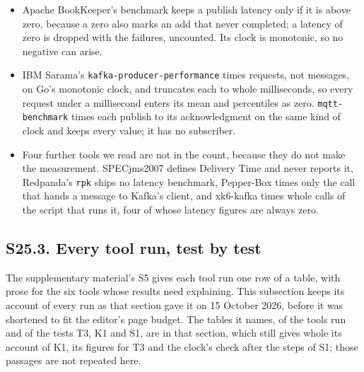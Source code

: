 \documentclass[10pt,journal,onecolumn]{IEEEtran}
\begin{document}
\begin{itemize}
starts at zero and only rises, so the value can never appear there.
\item Apache BookKeeper's benchmark keeps a publish latency only if it is above zero, because a
zero also marks an add that never completed; a latency of zero is dropped with the failures,
uncounted. Its clock is monotonic, so no negative can arise.
\item IBM Sarama's \texttt{kafka-producer-performance} times requests, not messages, on Go's
monotonic clock, and truncates each to whole milliseconds, so every request under a millisecond
enters its mean and percentiles as zero. \texttt{mqtt-benchmark} times each publish to its
acknowledgment on the same kind of clock and keeps every value; it has no subscriber.
\item Four further tools we read are not in the count, because they do not make the measurement.
SPECjms2007 defines Delivery Time and never reports it, Redpanda's \texttt{rpk} ships no latency
benchmark, Pepper-Box times only the call that hands a message to Kafka's client, and xk6-kafka
times whole calls of the script that runs it, four of whose latency figures are always zero.
\end{itemize}

\subsection{S25.3. Every tool run, test by test}
\label{sec:everytoolrun}

The supplementary material's S5 gives each tool run one row of a table, with prose for the six
tools whose results need explaining. This subsection keeps its account of every run as that
section gave it on 15 October 2026, before it was shortened to fit the editor's page budget. The
tables it names, of the tools run and of the tests T3, K1 and S1, are in that section, which still
gives whole its account of K1, its figures for T3 and the clock's check after the steps of S1;
those passages are not repeated here.
\end{document}

